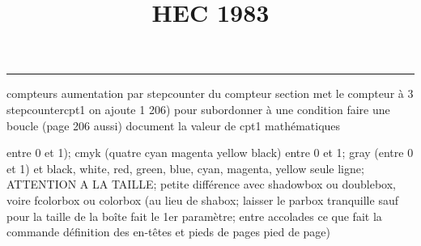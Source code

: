 \documentclass[11pt]{article}%
\title{\bf \vspace{-1cm} HEC 1983} %
\author{} %
\date{} %
\renewcommand{\headrulewidth}{0pt}%
\renewcommand{\footrulewidth}{0.4pt}%
\begin{document}
\maketitle %
\vspace{-1.2cm}\hrule %
\thispagestyle{fancy}

\vspace*{.4cm}


compteurs%
aumentation par stepcounter du compteur section%
met le compteur à 3%
stepcounter{cpt1} on ajoute 1%
206) pour subordonner à une condition %
faire une boucle (page 206 aussi) %
document la valeur de cpt1 
mathématiques\newcommand{\ch}{\operatorname{ch}} 
\newcommand{\sh}{\operatorname{sh}}
\renewcommand{\tanh}{\operatorname{th}}
\renewcommand{\sinh}{\operatorname{sh}}
\renewcommand{\cosh}{\operatorname{ch}}
\newcommand{\argsh}{\operatorname{argsh}}
\newcommand{\argch}{\operatorname{argch}}
\newcommand{\argth}{\operatorname{argth}}
\newcommand{\Id}{\operatorname{Id}}
\renewcommand{\leq}{\leq}
\renewcommand{\geq}{\geq }

\newcommand{\dlim}{\lim}
\newcommand{\dsum}{\sum}
\newcommand{\dprod}{\prod}



entre 0 et 1); cmyk (quatre cyan magenta yellow black) entre 0 et 1;
gray (entre 0 et 1) et black, white, red, green, blue, cyan, magenta,
yellow%
seule ligne; ATTENTION A LA TAILLE; petite différence avec shadowbox ou
doublebox, voire fcolorbox ou colorbox (au lieu de shabox; laisser le
parbox tranquille sauf pour la taille de la boîte
\newcommand{\Tbox}[1]{\begin{center} \shabox{\parbox{0.6
\linewidth}{#1}} \end{center}} %
fait le 1er paramètre; entre accolades ce que fait la commande
définition des en-têtes et pieds de pages\pagestyle{fancy}
\chead{}
\rfoot[ \ \thepage]{\thepage}
\cfoot{}
\lfoot{}
\thispagestyle{fancy} %
pied de page)\renewcommand{\footrulewidth}{0.4pt}
\renewcommand{\headrulewidth}{0.4pt}
\end{document}
